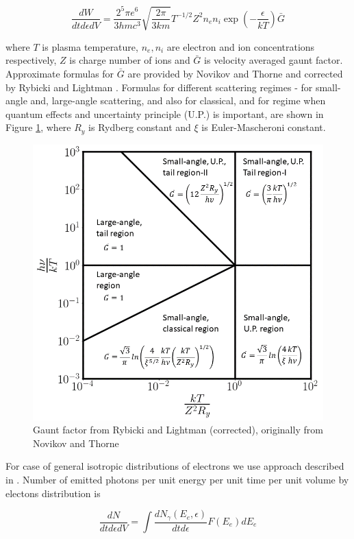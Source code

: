\begin{equation}
	\frac{dW}{dt d\epsilon dV} = \frac{2^5 \pi e^6}{3 h m c^3}\sqrt{\frac{2\pi}{3 k m}}T^{-1/2}Z^2n_e n_i\exp\left(-\frac{\epsilon}{kT}\right)\bar{G}
\end{equation}

where $T$ is plasma temperature, $n_e, n_i$ are electron and ion concentrations respectively, $Z$ is charge number of ions and $\bar{G}$ is velocity averaged gaunt factor. Approximate formulas for $\bar{G}$ are provided by Novikov and Thorne \cite{NovikovThorne} and corrected by Rybicki and Lightman \cite{Rybicki}. Formulas for different scattering regimes - for small-angle and, large-angle scattering, and also for classical, and for regime when quantum effects and uncertainty principle (U.P.) is important, are shown in Figure \ref{gaunt}, where $R_y$ is Rydberg constant and $\xi$ is Euler-Mascheroni constant.

\begin{figure}
	\centering
	\includegraphics[width=11.5 cm]{./fig_en/gaunt.png} 
	\caption{Gaunt factor from Rybicki and Lightman \cite{Rybicki} (corrected), originally from Novikov and Thorne \cite{NovikovThorne}}
	\label{gaunt}
\end{figure}

For case of general isotropic distributions of electrons we use approach described in \cite{Baring1999}. Number of emitted photons per unit energy per unit time per unit volume by electons distribution is

\begin{equation}
	\frac{dN}{dt d\epsilon dV} = \int\frac{dN_{\gamma}\left(E_e, \epsilon\right)}{dt d\epsilon} F(E_e) dE_e
\end{equation}

